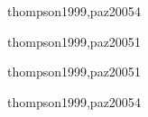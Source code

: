 \begin{syllabus}
\begin{unit}{\PFTWODef}{thompson1999,paz2005}{4}
   \begin{topics}
      \item \PFTWOTopicEstrategias
      \item \PFTWOTopicEl
      \item \PFTWOTopicEstrategiasde
      \item \PFTWOTopicEstrategiasdedepuracion
      \item \PFTWOTopicElConcepto
   \end{topics}
   \begin{unitgoals}
      \item \PFTWOObjONE
      \item \PFTWOObjTWO
      \item \PFTWOObjTHREE
      \item \PFTWOObjFOUR
   \end{unitgoals}
\end{unit}

\begin{unit}{\ALFIVEDef}{thompson1999,paz2005}{1}
   \begin{topics}
      \item \ALFIVETopicGramaticas
      \item \ALFIVETopicProblemas
      \item \ALFIVETopicFunciones
      \item \ALFIVETopicFunciones
   \end{topics}

   \begin{unitgoals}
      \item \ALFIVEObjFOUR
   \end{unitgoals}
\end{unit}

\begin{unit}{\PLTWODef}{thompson1999,paz2005}{1}

   \begin{topics}
      \item \PLTWOTopicEl
   \end{topics}

   \begin{unitgoals}
      \item \PLTWOObjONE
   \end{unitgoals}
\end{unit}

\begin{unit}{\PLSIXDef}{thompson1999,paz2005}{4}
   \begin{topics}
      \item \PLSIXTopicEncapsulacion
      \item \PLSIXTopicSeparacion
      \item \PLSIXTopicClases
      \item \PLSIXTopicPolimorfismo
      \item \PLSIXTopicJerarquias
   \end{topics}


\end{unit}
\end{syllabus}
